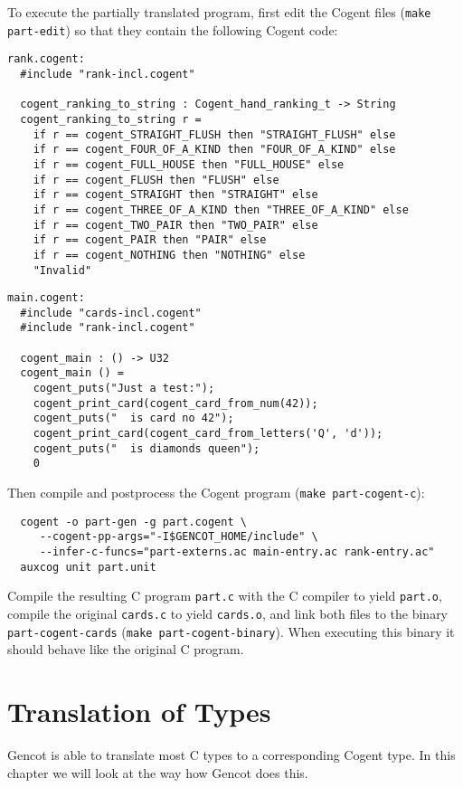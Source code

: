 \documentclass[a4paper]{report}
\newcommand{\code}[1]{\textnormal{\texttt{#1}}}
\begin{document}
To execute the partially translated program, first edit the Cogent files (\code{make part-edit}) so that they contain
the following Cogent code:
\begin{verbatim}
rank.cogent:
  #include "rank-incl.cogent"

  cogent_ranking_to_string : Cogent_hand_ranking_t -> String
  cogent_ranking_to_string r =
    if r == cogent_STRAIGHT_FLUSH then "STRAIGHT_FLUSH" else
    if r == cogent_FOUR_OF_A_KIND then "FOUR_OF_A_KIND" else
    if r == cogent_FULL_HOUSE then "FULL_HOUSE" else
    if r == cogent_FLUSH then "FLUSH" else
    if r == cogent_STRAIGHT then "STRAIGHT" else
    if r == cogent_THREE_OF_A_KIND then "THREE_OF_A_KIND" else
    if r == cogent_TWO_PAIR then "TWO_PAIR" else
    if r == cogent_PAIR then "PAIR" else
    if r == cogent_NOTHING then "NOTHING" else
    "Invalid"
\end{verbatim}

\begin{verbatim}
main.cogent:
  #include "cards-incl.cogent"
  #include "rank-incl.cogent"

  cogent_main : () -> U32
  cogent_main () =
    cogent_puts("Just a test:");
    cogent_print_card(cogent_card_from_num(42));
    cogent_puts("  is card no 42");
    cogent_print_card(cogent_card_from_letters('Q', 'd'));
    cogent_puts("  is diamonds queen");
    0
\end{verbatim}

Then compile and postprocess the Cogent program (\code{make part-cogent-c}):
\begin{verbatim}
  cogent -o part-gen -g part.cogent \
     --cogent-pp-args="-I$GENCOT_HOME/include" \
     --infer-c-funcs="part-externs.ac main-entry.ac rank-entry.ac"
  auxcog unit part.unit
\end{verbatim}

Compile the resulting C program \code{part.c} with the C compiler to yield \code{part.o},
compile the original \code{cards.c} to yield \code{cards.o}, and link both files to the binary
\code{part-cogent-cards} (\code{make part-cogent-binary}). When executing this binary it should
behave like the original C program.

\chapter{Translation of Types}
\label{types}

Gencot is able to translate most C types to a corresponding Cogent type. In this chapter we will look at the way 
how Gencot does this.
\end{document}
